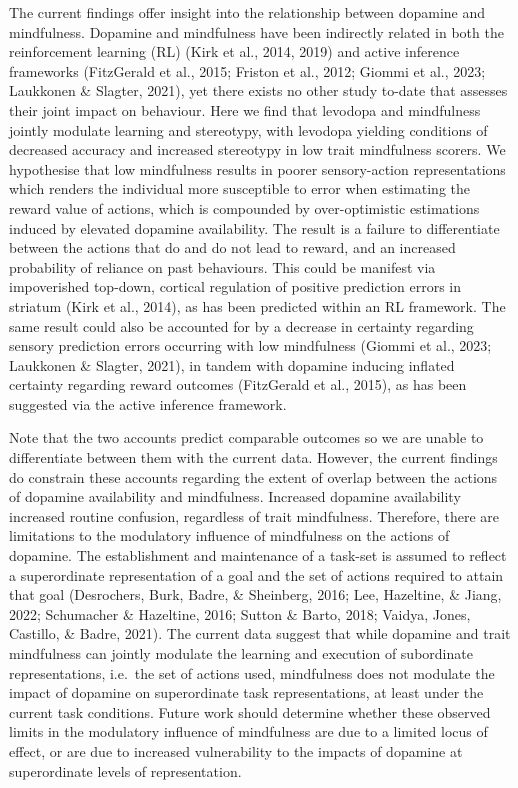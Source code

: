 \documentclass[
  man]{apa6}
\begin{document}
The current findings offer insight into the relationship between dopamine and mindfulness. Dopamine and mindfulness have been indirectly related in both the reinforcement learning (RL) (Kirk et al., 2014, 2019) and active inference frameworks (FitzGerald et al., 2015; Friston et al., 2012; Giommi et al., 2023; Laukkonen \& Slagter, 2021), yet there exists no other study to-date that assesses their joint impact on behaviour. Here we find that levodopa and mindfulness jointly modulate learning and stereotypy, with levodopa yielding conditions of decreased accuracy and increased stereotypy in low trait mindfulness scorers. We hypothesise that low mindfulness results in poorer sensory-action representations which renders the individual more susceptible to error when estimating the reward value of actions, which is compounded by over-optimistic estimations induced by elevated dopamine availability. The result is a failure to differentiate between the actions that do and do not lead to reward, and an increased probability of reliance on past behaviours. This could be manifest via impoverished top-down, cortical regulation of positive prediction errors in striatum (Kirk et al., 2014), as has been predicted within an RL framework. The same result could also be accounted for by a decrease in certainty regarding sensory prediction errors occurring with low mindfulness (Giommi et al., 2023; Laukkonen \& Slagter, 2021), in tandem with dopamine inducing inflated certainty regarding reward outcomes (FitzGerald et al., 2015), as has been suggested via the active inference framework.

Note that the two accounts predict comparable outcomes so we are unable to differentiate between them with the current data. However, the current findings do constrain these accounts regarding the extent of overlap between the actions of dopamine availability and mindfulness. Increased dopamine availability increased routine confusion, regardless of trait mindfulness. Therefore, there are limitations to the modulatory influence of mindfulness on the actions of dopamine. The establishment and maintenance of a task-set is assumed to reflect a superordinate representation of a goal and the set of actions required to attain that goal (Desrochers, Burk, Badre, \& Sheinberg, 2016; Lee, Hazeltine, \& Jiang, 2022; Schumacher \& Hazeltine, 2016; Sutton \& Barto, 2018; Vaidya, Jones, Castillo, \& Badre, 2021). The current data suggest that while dopamine and trait mindfulness can jointly modulate the learning and execution of subordinate representations, i.e.~the set of actions used, mindfulness does not modulate the impact of dopamine on superordinate task representations, at least under the current task conditions. Future work should determine whether these observed limits in the modulatory influence of mindfulness are due to a limited locus of effect, or are due to increased vulnerability to the impacts of dopamine at superordinate levels of representation.
\end{document}
